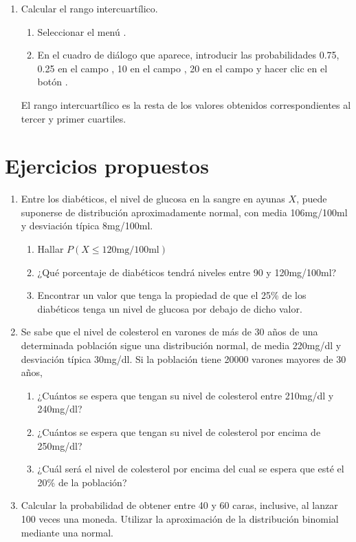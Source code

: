 \begin{enumerate}[leftmargin=*]
\begin{enumerate}
\item Calcular el rango intercuartílico.
\begin{indicacion}{
\begin{enumerate}
\item Seleccionar el menú .
\item En el cuadro de diálogo que aparece, introducir las probabilidades 0.75, 0.25 en el campo ,
10 en el campo , 20  en el campo  y
hacer clic en el botón .
\end{enumerate}
El rango intercuartílico es la resta de los valores obtenidos correspondientes al tercer y primer cuartiles.
}
\end{indicacion}
\end{enumerate}

\end{enumerate}


\section{Ejercicios propuestos}
\begin{enumerate}[leftmargin=*]
\item Entre los diabéticos, el nivel de glucosa en la sangre en ayunas $X$, puede suponerse de distribución
aproximadamente normal, con media 106mg/100ml y desviación típica 8mg/100ml.
\begin{enumerate}
\item Hallar $P(X\leq120\textrm{mg}/100\textrm{ml})$
\item ¿Qué porcentaje de diabéticos tendrá niveles entre 90 y 120mg/100ml?
\item Encontrar un valor que tenga la propiedad de que el 25\% de los diabéticos tenga un nivel de glucosa por debajo de
dicho valor.
\end{enumerate}

\item Se sabe que el nivel de colesterol en varones de más de 30 años de una determinada población sigue una
distribución normal, de media 220mg/dl y desviación típica 30mg/dl.
Si la población tiene 20000 varones mayores de 30 años,
\begin{enumerate}
\item ¿Cuántos se espera que tengan su nivel de colesterol entre 210mg/dl y 240mg/dl?
\item ¿Cuántos se espera que tengan su nivel de colesterol por encima de 250mg/dl?
\item ¿Cuál será el nivel de colesterol por encima del cual se espera que esté el 20\% de la población?
\end{enumerate}

\item Calcular la probabilidad de obtener entre 40 y 60 caras, inclusive, al lanzar 100 veces una moneda. 
Utilizar la aproximación de la distribución binomial mediante una normal.
\end{enumerate}
